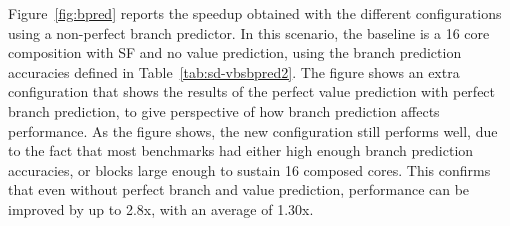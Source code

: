 Figure~\ref{fig:bpred} reports the speedup obtained with the different configurations using a non-perfect branch predictor.
In this scenario, the baseline is a 16 core composition with SF and no value prediction, using the branch prediction accuracies defined in Table~\ref{tab:sd-vbsbpred2}.
The figure shows an extra configuration that shows the results of the perfect value prediction with perfect branch prediction, to give perspective of how branch prediction affects performance.
As the figure shows, the new configuration still performs well, due to the fact that most benchmarks had either high enough branch prediction accuracies, or blocks large enough to sustain 16 composed cores.
This confirms that even without perfect branch and value prediction, performance can be improved by up to 2.8x, with an average of 1.30x.






